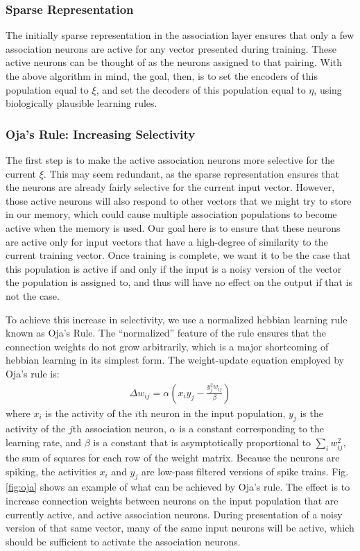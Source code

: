 \documentclass[10pt,letterpaper]{article}
\begin{document}
\subsubsection{Sparse Representation}
The initially sparse representation in the association layer ensures that only a few association neurons are active for any vector presented during training. These active neurons can be thought of as the neurons assigned to that pairing. With the above algorithm in mind, the goal, then, is to set the encoders of this population equal to $\xi$, and set the decoders of this population equal to $\eta$, using biologically plausible learning rules. 

\subsubsection{Oja's Rule: Increasing Selectivity}
The first step is to make the active association neurons more selective for the current $\xi$. This may seem redundant, as the sparse representation ensures that the neurons are already fairly selective for the current input vector. However, those active neurons will also respond to other vectors that we might try to store in our memory, which could cause multiple association populations to become active when the memory is used. Our goal here is to ensure that these neurons are active only for input vectors that have a high-degree of similarity to the current training vector. Once training is complete, we want it to be the case that this population is active if and only if the input is a noisy version of the vector the population is assigned to, and thus will have no effect on the output if that is not the case.

To achieve this increase in selectivity, we use a normalized hebbian learning rule known as Oja's Rule. The ``normalized'' feature of the rule ensures that the connection weights do not grow arbitrarily, which is a major shortcoming of hebbian learning in its simplest form. The weight-update equation employed by Oja's rule is:
\begin{align}
  \Delta w_{ij} = \alpha (x_i y_j - \frac{y_j^2 w_{ij}}{\beta})
\end{align}
where $x_i$ is the activity of the $i$th neuron in the input population, $y_j$ is the activity of the $j$th association neuron, $\alpha$ is a constant corresponding to the learning rate, and $\beta$ is a constant that is asymptotically proportional to $\sum_i w_{ij}^2$, the sum of squares for each row of the weight matrix. Because the neurons are spiking, the activities $x_i$ and $y_j$ are low-pass filtered versions of spike trains. Fig. \ref{fig:oja} shows an example of what can be achieved by Oja's rule. The effect is to increase connection weights between neurons on the input population that are currently active, and active association neurons. During presentation of a noisy version of that same vector, many of the same input neurons will be active, which should be sufficient to activate the association neurons.
\end{document}
